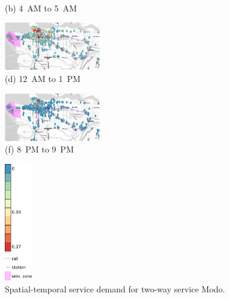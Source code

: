 \begin{figure}[hhh!!]
\begin{minipage}[b]{0.3\linewidth}
\begin{minipage}[b]{\linewidth}
           {\\(b) 4~AM to 5~AM}
         \end{minipage}
         \begin{minipage}[b]{\linewidth}
           \centering
           \hspace*{-0.1cm}
           \includegraphics[width=42mm]{modo_heatmaps/min/12.pdf}
           {\\(d) 12~AM to 1~PM}
         \end{minipage}
         \begin{minipage}[b]{\linewidth}
           \hspace*{-0.1cm}
           \centering
           \includegraphics[width=42mm]{modo_heatmaps/min/20.pdf}
           {\\(f) 8~PM to 9~PM}
         \end{minipage}
   \end{minipage}
   \begin{minipage}[b]{0.1\linewidth}
   \centering
   		 \hspace*{12mm}
   		 \includegraphics[width=12mm]{modo_heatmaps/legenda_modo.pdf}
         \vspace{17mm}
   \end{minipage}
   \caption{Spatial-temporal service demand for two-way service Modo.}
   \label{fig:4_4_heat_modo}
\end{figure}

